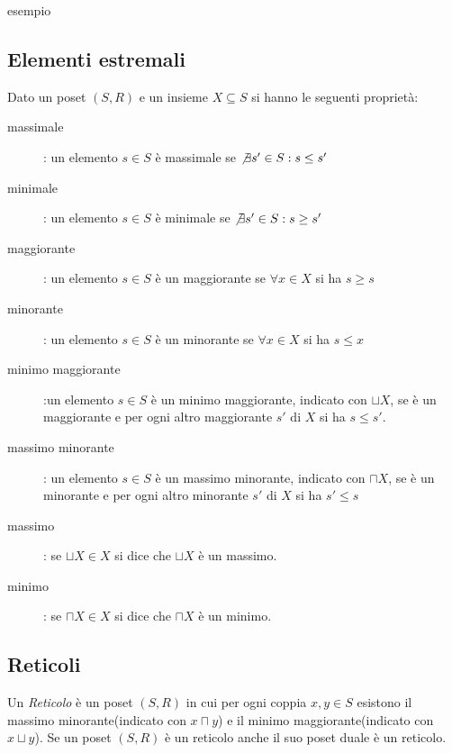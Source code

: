 esempio

\subsection{Elementi estremali}
Dato un poset $(S,R)$ e un insieme $X \subseteq S$ si hanno le seguenti proprietà:
\begin{description}
    \item[massimale]: un elemento $s \in S$ è massimale se $\not \exists s' \in S : s \leq s'$
    \item[minimale]: un elemento $s \in S$ è minimale se $\not \exists s' \in S : s \geq s'$
    \item[maggiorante]: un elemento $s \in S$ è un maggiorante se $\forall x \in X$ si ha $s \geq s$
    \item[minorante]: un elemento $s \in S$ è un minorante se $\forall x \in X$ si ha $s \leq x$
    \item[minimo maggiorante]:un elemento $s \in S$ è un minimo maggiorante, indicato con $\sqcup X$,
          se è un maggiorante e per ogni altro maggiorante $s'$ di $X$ si ha $s \leq s'$.
    \item[massimo minorante]: un elemento $s \in S$ è un massimo minorante, indicato con $\sqcap X$,
          se è un minorante e per ogni altro minorante $s'$ di $X$ si ha $s' \leq s$
    \item[massimo]: se $\sqcup X \in X$ si dice che $\sqcup X$ è un massimo.
    \item[minimo]: se $\sqcap X \in X$ si dice che $\sqcap X$ è un minimo.
\end{description}



\subsection{Reticoli}
Un \emph{Reticolo} è un poset $(S,R)$ in cui per ogni coppia $x,y \in S$ esistono
il massimo minorante(indicato con $x \sqcap y$) e il minimo maggiorante(indicato con $x \sqcup y$).
Se un poset $(S,R)$ è un reticolo anche il suo poset duale è un reticolo.

